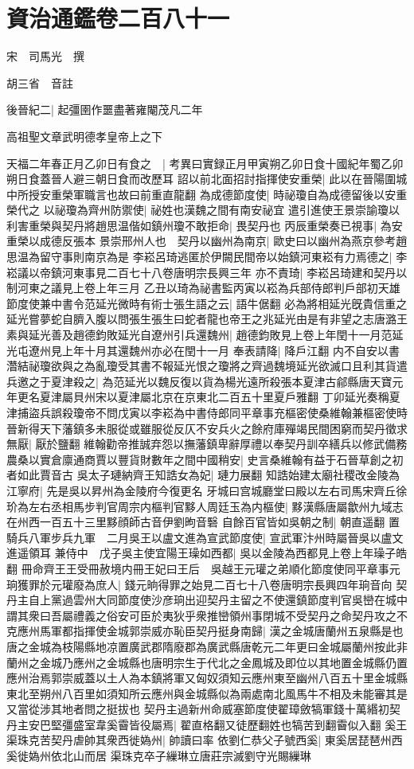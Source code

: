 \section{資治通鑑卷二百八十一}
宋　司馬光　撰

胡三省　音註

後晉紀二|{
	起彊圉作噩盡著雍閹茂凡二年}


高祖聖文章武明德孝皇帝上之下

天福二年春正月乙卯日有食之　|{
	考異曰實録正月甲寅朔乙卯日食十國紀年蜀乙卯朔日食蓋晉人避三朝日食而改歷耳}
詔以前北面招討指揮使安重榮|{
	此以在晉陽圍城中所授安重榮軍職言也故曰前重直龍翻}
為成德節度使|{
	時祕瓊自為成德留後以安重榮代之}
以祕瓊為齊州防禦使|{
	祕姓也漢魏之間有南安祕宜}
遣引進使王景崇諭瓊以利害重榮與契丹將趙思温偕如鎮州瓊不敢拒命|{
	畏契丹也}
丙辰重榮奏已視事|{
	為安重榮以成德反張本}
景崇邢州人也　契丹以幽州為南京|{
	歐史曰以幽州為燕京參考趙思温為留守事則南京為是}
李崧呂琦逃匿於伊闕民間帝以始鎮河東崧有力焉德之|{
	李崧議以帝鎮河東事見二百七十八卷唐明宗長興三年}
亦不責琦|{
	李崧呂琦建和契丹以制河東之議見上卷上年三月}
乙丑以琦為祕書監丙寅以崧為兵部侍郎判戶部初天雄節度使兼中書令范延光微時有術士張生語之云|{
	語牛倨翻}
必為將相延光旣貴信重之延光嘗夢蛇自臍入腹以問張生張生曰蛇者龍也帝王之兆延光由是有非望之志唐潞王素與延光善及趙德鈞敗延光自遼州引兵還魏州|{
	趙德鈞敗見上卷上年閏十一月范延光屯遼州見上年十月其還魏州亦必在閏十一月}
奉表請降|{
	降戶江翻}
内不自安以書濳結祕瓊欲與之為亂瓊受其書不報延光恨之瓊將之齊過魏境延光欲滅口且利其貨遣兵邀之于夏津殺之|{
	為范延光以魏反復以貨為楊光遠所殺張本夏津古鄃縣唐天寶元年更名夏津屬貝州宋以夏津屬北京在京東北二百五十里夏戶雅翻}
丁卯延光奏稱夏津捕盜兵誤殺瓊帝不問戊寅以李崧為中書侍郎同平章事充樞密使桑維翰兼樞密使時晉新得天下藩鎮多未服從或雖服從反仄不安兵火之餘府庫殫竭民間困窮而契丹徵求無厭|{
	厭於鹽翻}
維翰勸帝推誠弃怨以撫藩鎮卑辭厚禮以奉契丹訓卒繕兵以修武備務農桑以實倉廪通商賈以豐貨財數年之間中國稍安|{
	史言桑維翰有益于石晉草創之初者如此賈音古}
吳太子璉納齊王知誥女為妃|{
	璉力展翻}
知誥始建太廟社稷改金陵為江寧府|{
	先是吳以昇州為金陵府今復更名}
牙城曰宫城廳堂曰殿以左右司馬宋齊丘徐玠為左右丞相馬步判官周宗内樞判官黟人周廷玉為内樞使|{
	黟漢縣唐屬歙州九域志在州西一百五十三里黟顔師古音伊劉昫音䃜}
自餘百官皆如吳朝之制|{
	朝直遥翻}
置騎兵八軍步兵九軍　二月吳王以盧文進為宣武節度使|{
	宣武軍汴州時屬晉吳以盧文進遥領耳}
兼侍中　戊子吳主使宜陽王璪如西都|{
	吳以金陵為西都見上卷上年璪子皓翻}
冊命齊王王受冊赦境内冊王妃曰王后　吳越王元瓘之弟順化節度使同平章事元珦獲罪於元瓘廢為庶人|{
	錢元晌得罪之始見二百七十八卷唐明宗長興四年珦音向}
契丹主自上黨過雲州大同節度使沙彦珦出迎契丹主留之不使還鎮節度判官吳巒在城中謂其衆曰吾屬禮義之俗安可臣於夷狄乎衆推巒領州事閉城不受契丹之命契丹攻之不克應州馬軍都指揮使金城郭崇威亦恥臣契丹挺身南歸|{
	漢之金城唐蘭州五泉縣是也唐之金城為枝陽縣地凉置廣武郡隋廢郡為廣武縣唐乾元二年更曰金城屬蘭州按此非蘭州之金城乃應州之金城縣也唐明宗生于代北之金鳳城及即位以其地置金城縣仍置應州治焉郭崇威蓋以土人為本鎮將軍又匈奴須知云應州東至幽州八百五十里金城縣東北至朔州八百里如須知所云應州與金城縣似為兩處南北風馬牛不相及未能審其是又當從涉其地者問之挺拔也}
契丹主過新州命威塞節度使翟璋斂犒軍錢十萬緡初契丹主安巴堅彊盛室韋奚霫皆役屬焉|{
	翟直格翻又徒歷翻姓也犒苦到翻霫似入翻}
奚王渠珠克苦契丹虐帥其衆西徙媯州|{
	帥讀曰率}
依劉仁恭父子號西奚|{
	東奚居琵琶州西奚徙媯州依北山而居}
渠珠克卒子繅琳立唐莊宗滅劉守光賜繅琳

